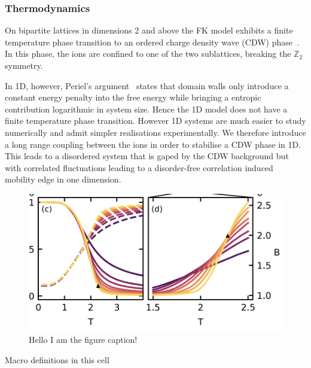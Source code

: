 \hypertarget{thermodynamics}{%
\subsubsection{Thermodynamics}\label{thermodynamics}}

On bipartite lattices in dimensions 2 and above the FK model exhibits a finite temperature phase transition to an ordered charge density wave (CDW) phase~\autocite{maskaThermodynamicsTwodimensionalFalicovKimball2006}. In this phase, the ions are confined to one of the two sublattices, breaking the \(\mathbb{Z}_2\) symmetry.

In 1D, however, Periel's argument~\autocite{peierlsIsingModelFerromagnetism1936,kennedyItinerantElectronModel1986} states that domain walls only introduce a constant energy penalty into the free energy while bringing a entropic contribution logarithmic in system size. Hence the 1D model does not have a finite temperature phase transition. However 1D systems are much easier to study numerically and admit simpler realisations experimentally. We therefore introduce a long range coupling between the ions in order to stabilise a CDW phase in 1D. This leads to a disordered system that is gaped by the CDW background but with correlated fluctuations leading to a disorder-free correlation induced mobility edge in one dimension.

\hypertarget{fig:binder}{%
\begin{figure}
\centering
\includegraphics[width=1\textwidth,height=\textheight]{../figure_code/fk_chapter/binder.png}
\caption[{no title}]{Hello I am the figure caption!}
\label{fig:binder}
\end{figure}
}

Macro definitions in this cell \[
\newcommand{\expval}[1]{\langle #1 \rangle}
\newcommand{\ket}[1]{|#1\rangle}
\newcommand{\bra}[1]{\langle#1|}
\newcommand{\op}[2]{|#1\rangle \langle#2|}
\]

